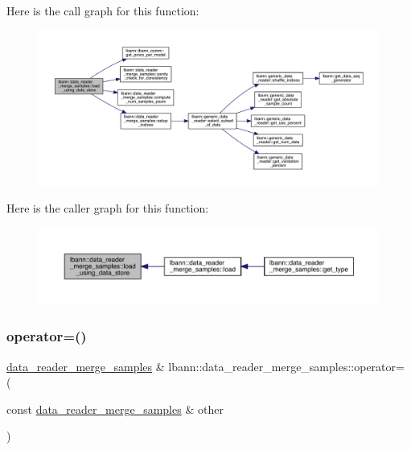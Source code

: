 Here is the call graph for this function\+:\nopagebreak
\begin{figure}[H]
\begin{center}
\leavevmode
\includegraphics[width=350pt]{classlbann_1_1data__reader__merge__samples_ad45275b73fcbca47b74a9c9767f69bc9_cgraph}
\end{center}
\end{figure}
Here is the caller graph for this function\+:\nopagebreak
\begin{figure}[H]
\begin{center}
\leavevmode
\includegraphics[width=350pt]{classlbann_1_1data__reader__merge__samples_ad45275b73fcbca47b74a9c9767f69bc9_icgraph}
\end{center}
\end{figure}
\mbox{\label{classlbann_1_1data__reader__merge__samples_a781fcc341e120886a3359e8ab41121d7}} 
\subsubsection{\texorpdfstring{operator=()}{operator=()}}
{\footnotesize\ttfamily \hyperlink{classlbann_1_1data__reader__merge__samples}{data\+\_\+reader\+\_\+merge\+\_\+samples} \& lbann\+::data\+\_\+reader\+\_\+merge\+\_\+samples\+::operator= (\begin{DoxyParamCaption}\item[{const \hyperlink{classlbann_1_1data__reader__merge__samples}{data\+\_\+reader\+\_\+merge\+\_\+samples} \&}]{other }\end{DoxyParamCaption})}



